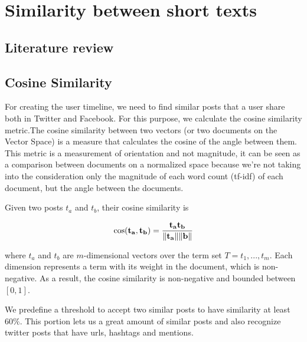 \section{Similarity between short texts}

\subsection{Literature review}

\subsection{Cosine Similarity}

For creating the user timeline, we need to find similar posts that a user share both in Twitter and Facebook. For this purpose, we calculate the cosine similarity metric.The cosine similarity \cite{similarity} between two vectors (or two documents on the Vector Space) is a measure that calculates the cosine of the angle between them. This metric is a measurement of orientation and not magnitude, it can be seen as a comparison between documents on a normalized space because we’re not taking into the consideration only the magnitude of each word count (tf-idf) of each document, but the angle between the documents. 

Given two posts $t_{a}$ and $t_{b}$, their cosine similarity is

\begin{equation}
\cos ({\bf t_{a}},{\bf t_{b}})= {{\bf t_{a}} {\bf t_{b}} \over \|{\bf t_{a}}\| \|{\bf \textbf{b}}\|} 
\end{equation}

where  $t_{a}$ and $t_{b}$ are $m$-dimensional vectors over the term set
$T = {t_{1}, . . . , t_{m}}$. Each dimension represents a term with its
weight in the document, which is non-negative. As a result, the cosine similarity 
is non-negative and bounded between $[0,1]$. 

We predefine a threshold to accept two similar posts to have similarity at least $60\%$. This portion lets us a great amount of similar posts and also recognize twitter posts that have urls, hashtags and mentions.
